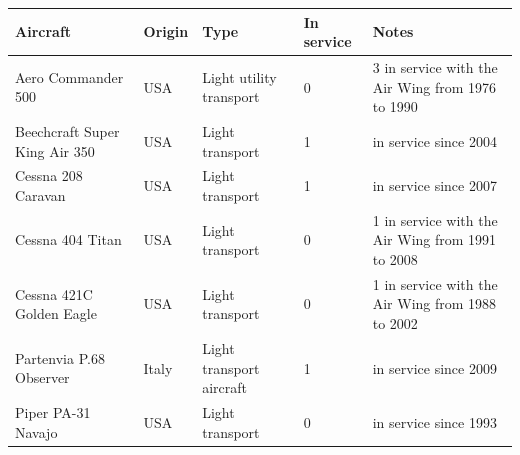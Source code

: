 \documentclass{article}
\begin{document}
\begin{tabular}{lllll}
\toprule
Aircraft & Origin & Type & In service & Notes \\
\midrule
Aero Commander 500 & USA & Light utility transport & 0 & 3 in service with the Air Wing from 1976 to 1990 \\
Beechcraft Super King Air 350 & USA & Light transport & 1 & in service since 2004 \\
Cessna 208 Caravan & USA & Light transport & 1 & in service since 2007 \\
Cessna 404 Titan & USA & Light transport & 0 & 1 in service with the Air Wing from 1991 to 2008 \\
Cessna 421C Golden Eagle & USA & Light transport & 0 & 1 in service with the Air Wing from 1988 to 2002 \\
Partenvia P.68 Observer & Italy & Light transport aircraft & 1 & in service since 2009 \\
Piper PA-31 Navajo & USA & Light transport & 0 & in service since 1993 \\
\bottomrule
\end{tabular}
\end{document}

